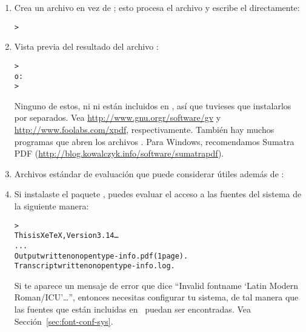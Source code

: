 \documentclass{article}
\begin{document}
\begin{enumerate}
\item Crea un archivo  en vez de \dvi{}; esto procesa el
	archivo  y escribe el  directamente:
\begin{alltt}
> 
\end{alltt}

\item Vista previa del resultado del archivo :
\begin{alltt}
> 
\textrm{o:}
> 
\end{alltt}
Ninguno de estos, ni  ni  están incluidos en
\TL{}, así que tuvieses que instalarlos por separados. Vea
\url{http://www.gnu.orgr/software/gv} y
\url{http://www.foolabs.com/xpdf}, respectivamente. También hay
muchos programas que abren los archivos . Para Windows,
recomendamos Sumatra PDF
(\url{http://blog.kowalczyk.info/software/sumatrapdf}).

\item Archivos estándar de evaluación que puede considerar útiles
	además de :

\item Si instalaste el paquete , puedes evaluar el
	acceso a las fuentes del sistema de la siguiente manera:
\begin{alltt}
> 
This is XeTeX, Version 3.14\ldots
...
Output written on opentype-info.pdf (1 page).
Transcript written on opentype-info.log.
\end{alltt}

Si te aparece un mensaje de error que dice ``Invalid fontname `Latin
Modern Roman/ICU'\ldots'', entonces necesitas configurar tu sistema,
de tal manera que las fuentes que están incluidas en \TL\ puedan ser
encontradas. Vea 
Sección~\ref{sec:font-conf-sys}.

\end{enumerate}
\end{document}
